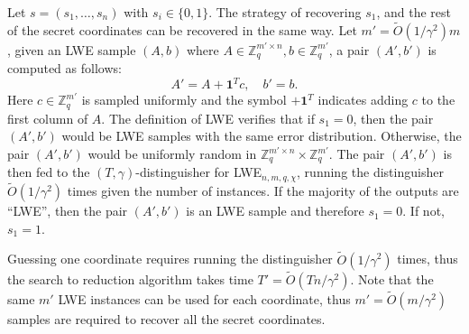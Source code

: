\documentclass{article}
\begin{document}
    Let \( s = (s_1, \ldots, s_n) \) with \( s_i \in \{0, 1\} \). The strategy of recovering \( s_1 \), and the rest of the secret coordinates can be recovered in the same way. Let \( m' = \tilde{O}(1/\gamma^2)m \), given an LWE sample \( (A, b) \) where \( A \in \mathbb{Z}_q^{m' \times n}, b \in \mathbb{Z}_q^{m'} \), a pair \( (A', b') \) is computed as follows:
    \[
    A' = A + \mathbf{1}^T c, \quad b' = b.
    \]
    Here \( c \in \mathbb{Z}_q^{m'} \) is sampled uniformly and the symbol \( +\mathbf{1}^T \) indicates adding \( c \) to the first column of \( A \). The definition of LWE verifies that if \( s_1 = 0 \), then the pair \( (A', b') \) would be LWE samples with the same error distribution. Otherwise, the pair \( (A', b') \) would be uniformly random in \( \mathbb{Z}_q^{m' \times n} \times \mathbb{Z}_q^{m'} \). The pair \( (A', b') \) is then fed to the \( (T, \gamma) \)-distinguisher for LWE$_{n,m,q,\chi}$, running the distinguisher \( \tilde{O}(1/\gamma^2) \) times given the number of instances. If the majority of the outputs are “LWE”, then the pair \( (A', b') \) is an LWE sample and therefore \( s_1 = 0 \). If not, \( s_1 = 1 \).
    
    Guessing one coordinate requires running the distinguisher \( \tilde{O}(1/\gamma^2) \) times, thus the search to reduction algorithm takes time \( T' = \tilde{O}(Tn/\gamma^2) \). Note that the same \( m' \) LWE instances can be used for each coordinate, thus \( m' = \tilde{O}(m/\gamma^2) \) samples are required to recover all the secret coordinates.
    
\end{document}
